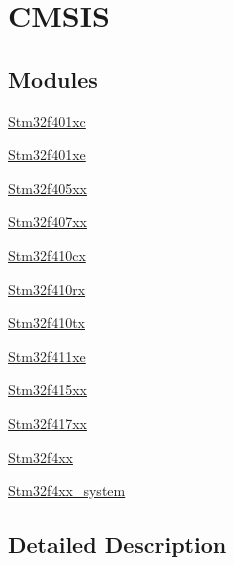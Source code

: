 \hypertarget{group___c_m_s_i_s}{}\section{C\+M\+S\+IS}
\label{group___c_m_s_i_s}
\subsection*{Modules}
\begin{DoxyCompactItemize}
\item 
\hyperlink{group__stm32f401xc}{Stm32f401xc}
\item 
\hyperlink{group__stm32f401xe}{Stm32f401xe}
\item 
\hyperlink{group__stm32f405xx}{Stm32f405xx}
\item 
\hyperlink{group__stm32f407xx}{Stm32f407xx}
\item 
\hyperlink{group__stm32f410cx}{Stm32f410cx}
\item 
\hyperlink{group__stm32f410rx}{Stm32f410rx}
\item 
\hyperlink{group__stm32f410tx}{Stm32f410tx}
\item 
\hyperlink{group__stm32f411xe}{Stm32f411xe}
\item 
\hyperlink{group__stm32f415xx}{Stm32f415xx}
\item 
\hyperlink{group__stm32f417xx}{Stm32f417xx}
\item 
\hyperlink{group__stm32f4xx}{Stm32f4xx}
\item 
\hyperlink{group__stm32f4xx__system}{Stm32f4xx\+\_\+system}
\end{DoxyCompactItemize}


\subsection{Detailed Description}
